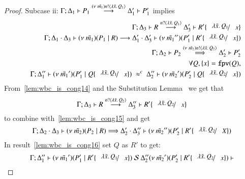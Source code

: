 \begin{proof}
	\noi Subcase ii:
	$\Gamma; \Delta_1 \vdash P_1 \stackrel{(\nu\ \tilde{m_1}) n ! \langle \lambda \tilde{x}.\,Q_1 \rangle}{\longrightarrow} \Delta_1' \vdash P_1'$
	implies
%
	\begin{eqnarray}
		& & \horel{\Gamma}{\Delta_3}{R}{\by{\bactinp{n}{\abs{\tilde{x}} {Q_1}}}}{\Delta_3'}{R' \subst{\abs{\tilde{x}}{Q_1}}{x}}
		\label{lem:wbc_is_cong14}\\
		& & \horel{\Gamma}{\Delta_1 \cat \Delta_3}{\newsp{\tilde{m_1}}{P_1 \Par R}}{\by{}}{\Delta_1' \cat \Delta_3'}{\newsp{\tilde{m_1}''}{P_1' \Par R' \subst{\abs{\tilde{x}}{Q_1}}{x}}}
		\nonumber \\
		& & \horel{\Gamma}{\Delta_2}{P_2}{\By{\news{\tilde{m_2}} \bactout{n}{\abs{\tilde{x}}{Q_2}}}}{\Delta_2'}{P_2'}
		\label{lem:wbc_is_cong15}\\
		& & \forall Q, \set{x} = \fpv{Q}, \nonumber \\
		& & \horel{\Gamma}{\Delta_1''}{\newsp{\tilde{m_1}'}{P_1' \Par Q \subst{\abs{\tilde{x}}{Q_1}}{x}}}{\ \wbc\ }{\Delta_2''}{\newsp{\tilde{m_2}'}{P_2' \Par Q \subst{\abs{\tilde{x}}{Q_2}}{x}}}
		\label{lem:wbc_is_cong16}
	\end{eqnarray}
%
	From~\ref{lem:wbc_is_cong14} and the Substitution Lemma~ we get that
	\[
		\horel{\Gamma}{\Delta_3}{R}{\by{\bactinp{n}{\abs{\tilde{x}} {Q_2}}}}{\Delta_3''}{R' \subst{\abs{\tilde{x}}{Q_2}}{x}}
	\]
	\noi to combine with~\ref{lem:wbc_is_cong15} and get
	\[
		\horel{\Gamma}{\Delta_2 \cat \Delta_3}{\newsp{\tilde{m_2}}{P_2 \Par R}}{\By{}}{\Delta_2' \cat \Delta_3''}{\newsp{\tilde{m_2}''}{P_2' \Par R' \subst{\abs{\tilde{x}}{Q_2}}{X}}}
	\]
%
	\noi In result~\ref{lem:wbc_is_cong16} set $Q$ as $R'$ to get:
%
	\[
		\horel{\Gamma}{\Delta_1''}{\newsp{\tilde{m_1}'}{P_1' \Par R' \subst{\abs{\tilde{x}}{Q_1}}{x}}}
		{\ \mathcal{S}\ \Delta_2''}
		{\newsp{\tilde{m_2}'}{P_2' \Par R' \subst{\abs{\tilde{x}}{Q_2}}{x}}}
	\]


\end{proof}
